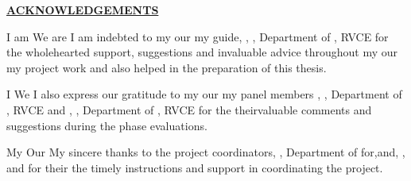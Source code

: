 \thispagestyle{empty}
\ifIDP \vspace{-1cm}\fi
\begin{center}
	\Large\textbf{\underline{ACKNOWLEDGEMENTS}} \par
\end{center}

\ifPG I am \else
\ifStuNameBUsed We are \else I am \fi\fi indebted to \ifPG my \else\ifStuNameBUsed our \else my \fi\fi guide, \textbf{\printGuideNameA}, \printGuideDesigA, Department of \printGuideDeptAInSF, RVCE for the wholehearted support, suggestions and invaluable advice throughout \ifPG my \else\ifStuNameBUsed our \else my \fi\fi project work and also helped in the preparation of this thesis.\\ \par

\ifPG I \else \ifStuNameBUsed We \else I \fi\fi also express our gratitude to \ifPG my \else\ifStuNameBUsed our \else my \fi\fi  panel member\ifIDP\space\else s \fi\textbf{\printPanelMemberA}, \printPanelMemberDesigA, Department of \printPanelMemberDeptAInSF, RVCE \ifIDP \else and \textbf{\printPanelMemberB}, \printPanelMemberDesigB , Department of \printPanelMemberDeptBInSF, RVCE \fi for \ifPanelMemBUsed the \else their\fi valuable comments and suggestions during the phase evaluations. \\ \par

\ifPG My \else \ifStuNameBUsed Our \else My \fi\fi sincere thanks to the project coordinator\ifIDP\else\ifProjectMemBUsed s\fi\fi\space \textbf{\printProjectMemberA}, \printPanelMemberDesigA, Department of \printProjectMemberDeptAInSF \ifIDP \space for\space \else\ifProjectMemBUsed \ifProjectMemCUsed,\space \else\space and\space \fi\textbf{\printProjectMemberB}, \printPanelMemberDesigB,  \ifProjectMemCUsed\space and \textbf{\printProjectMemberC} \fi\fi\space for \ifProjectMemBUsed their \else the \fi\fi timely instructions and support in coordinating the project.\\ \par

